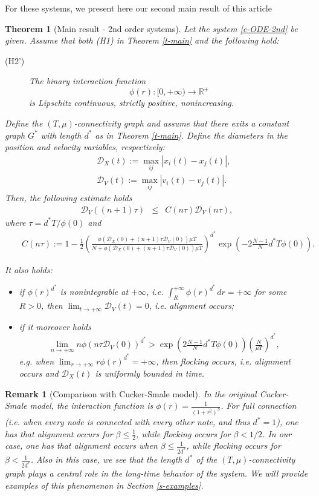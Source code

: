 \documentclass[journal]{article}
\newcommand{\R}{\mathbb{R}}
\newtheorem{theorem}{Theorem}
\newtheorem{remark}[lemma]{Remark}
\newcommand{\D}{\mathcal{D}}
\begin{document}
For these systems, we present here our second main result of this article 
\begin{theorem}[Main result - 2nd order systems]\label{t-main2} Let the system \eqref{e-ODE-2nd} be given. Assume that both (H1) in Theorem \ref{t-main} and the following hold:
\begin{description}
\item[(H2') \label{hyp:Lip2}] The binary interaction function $$\phi(r):[0,+\infty)\to \R^+$$ is Lipschitz continuous, strictly positive, nonincreasing.
\end{description}


Define the $(T,\mu)$-connectivity graph and assume that there exits a constant graph $G^*$ with length $d^*$ as in Theorem \ref{t-main}.  Define the diameters in the position and velocity variables, respectively:
\begin{eqnarray}
&&\D_X(t):=\max_{ij}|x_i(t)-x_j(t)|,\\
&&\D_V(t):=\max_{ij}|v_i(t)-v_j(t)|.
\end{eqnarray}
Then, the following estimate holds
\begin{eqnarray}
\D_V((n+1)\tau)&\leq&C(n\tau)\D_V(n\tau),\label{e-stimaV}
\end{eqnarray}
 where $\tau= d^*T/\phi(0)$ and 
\begin{eqnarray*}
&&C(n\tau):= 1-\frac12\left( \tfrac{\phi(\D_X(0)+(n+1)\tau \D_V(0))\mu T}{N+\phi(\D_X(0)+(n+1)\tau \D_V(0))\mu T}    \right)^{d^*}
\exp(-2\tfrac{N-1}{N}d^*T\phi(0)).
\end{eqnarray*}

It also holds:
\begin{itemize}
\item if $\phi(r)^{d^*}$ is nonintegrable at $+\infty$, i.e. $\int_R^{+\infty}\phi(r)^{d^*}\,dr=+\infty$ for some $R>0$, then $\lim_{t\to+\infty} \D_V(t)=0$, i.e. alignment occurs;
\item if it moreover holds $$
\lim_{n\to+\infty} n  \phi(n\tau \D_V(0))^{d^*}>\exp(2\tfrac{N-1}{N}d^*T\phi(0))\left(\tfrac{N}{\mu T}\right)^{d^*},
$$
e.g. when $\lim_{r\to+\infty}r\phi(r)^{d^*}=+\infty$, then flocking occurs, i.e. alignment occurs and $\D_X(t)$ is uniformly bounded in time.
\end{itemize}
\end{theorem}
\begin{remark}[Comparison with Cucker-Smale model] In the original Cucker-Smale model, the interaction function is $\phi(r)=\frac{1}{(1+r^2)^\beta}$. For full connection
(i.e. when every node is connected with every other note, and thus $d^*=1$), one has that alignment occurs for $\beta\leq \frac12$, while flocking occurs for $\beta<1/2$. In our case, one has that alignment occurs when $\beta\leq\frac1{2d^*}$, while flocking occurs for $\beta<\frac1{2d^*}$. Also in this case, we see that the length $d^*$ of the $(T,\mu)$-connectivity graph plays a central role in the long-time behavior of the system. We will provide examples of this phenomenon in Section \ref{s-examples}.
\end{remark}
\end{document}
